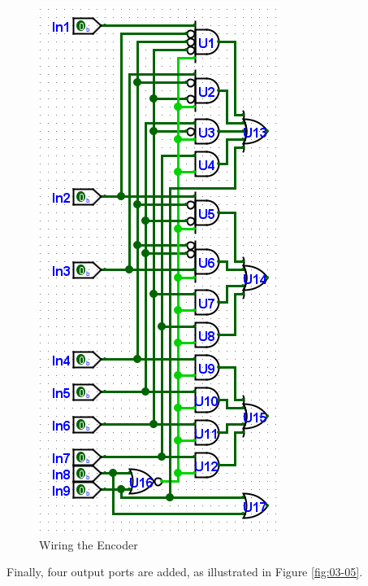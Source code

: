 \begin{figure}[H]
	\centering
	\includegraphics[width=\maxwidth{.95\linewidth}]{gfx/03-04}
	\caption{Wiring the Encoder}
	\label{fig:03-04}
\end{figure}

Finally, four output ports are added, as illustrated in Figure \ref{fig:03-05}. 


